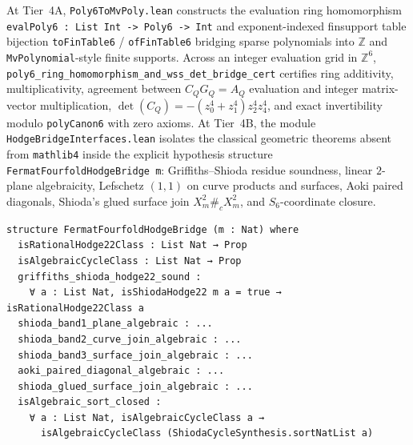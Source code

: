 \documentclass[11pt,a4paper]{article}
\begin{document}
At Tier~4A, \texttt{Poly6ToMvPoly.lean} constructs the evaluation ring homomorphism \texttt{evalPoly6 : List Int -> Poly6 -> Int} and exponent-indexed finsupport table bijection \texttt{toFinTable6} / \texttt{ofFinTable6} bridging sparse polynomials into $\mathbb{Z}$ and \texttt{MvPolynomial}-style finite supports. Across an integer evaluation grid in $\mathbb{Z}^6$, \texttt{poly6\_ring\_homomorphism\_and\_wss\_det\_bridge\_cert} certifies ring additivity, multiplicativity, agreement between $C_Q G_Q = A_Q$ evaluation and integer matrix-vector multiplication, $\det(C_Q) = -(z_0^4 + z_1^4) z_2^4 z_4^4$, and exact invertibility modulo \texttt{polyCanon6} with zero axioms. At Tier~4B, the module \texttt{HodgeBridgeInterfaces.lean} isolates the classical geometric theorems absent from \texttt{mathlib4} inside the explicit hypothesis structure \texttt{FermatFourfoldHodgeBridge m}: Griffiths--Shioda residue soundness, linear $2$-plane algebraicity, Lefschetz $(1,1)$ on curve products and surfaces, Aoki paired diagonals, Shioda's glued surface join $X_m^2 \#_c X_m^2$, and $S_6$-coordinate closure.

\begin{lstlisting}[caption={Explicit classical analytic-to-algebraic bridge interface in \texttt{HodgeBridgeInterfaces.lean}.}]
structure FermatFourfoldHodgeBridge (m : Nat) where
  isRationalHodge22Class : List Nat → Prop
  isAlgebraicCycleClass : List Nat → Prop
  griffiths_shioda_hodge22_sound :
    ∀ a : List Nat, isShiodaHodge22 m a = true → isRationalHodge22Class a
  shioda_band1_plane_algebraic : ...
  shioda_band2_curve_join_algebraic : ...
  shioda_band3_surface_join_algebraic : ...
  aoki_paired_diagonal_algebraic : ...
  shioda_glued_surface_join_algebraic : ...
  isAlgebraic_sort_closed :
    ∀ a : List Nat, isAlgebraicCycleClass a →
      isAlgebraicCycleClass (ShiodaCycleSynthesis.sortNatList a)
\end{lstlisting}
\end{document}
